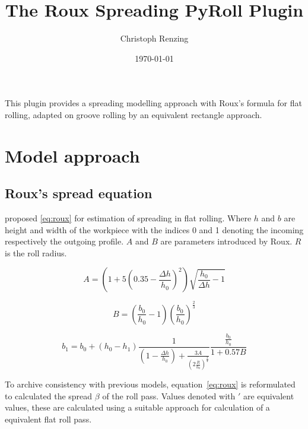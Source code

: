 \documentclass[11pt]{PyRollDocs}
\begin{document}
    \title{The Roux Spreading PyRoll Plugin}
    \author{Christoph Renzing}
    \date{\today}

    \maketitle

    This plugin provides a spreading modelling approach with Roux's formula for flat rolling, adapted on groove rolling by an equivalent rectangle approach.


    \section{Model approach}\label{sec:model-approach}

    \subsection{Roux's spread equation}\label{subsec:roux's-spread-equation}

    \textcite{Roux1939} proposed \autoref{eq:roux} for estimation of spreading in flat rolling.
    Where $h$ and $b$ are height and width of the workpiece with the indices 0 and 1 denoting the incoming respectively the outgoing profile.
    $A$ and $B$ are parameters introduced by Roux.
    $R$ is the roll radius.


    \begin{equation}
        A = \left( 1 + 5 \left( 0.35 - \frac{\Delta h}{h_0}\right)^2 \right) \sqrt{\frac{h_0}{\Delta h} - 1}
        \label{eq:roux-parameter-a}
    \end{equation}

    \begin{equation}
        B = \left( \frac{b_0}{h_0} - 1 \right) \left( \frac{b_0}{h_0} \right)^{\frac{2}{3}}
        \label{eq:roux-parameter-b}
    \end{equation}

    \begin{equation}
        b_1 = b_0 + \left( h_0 - h_1 \right) \frac{1}{\left( 1 - \frac{\Delta h}{h_0} \right) + \frac{3 A}{\left( 2 \frac{R}{h_0} \right)^{\frac{3}{4}}}} \frac{\frac{b_0}{h_0}}{1 + 0.57 B}
        \label{eq:roux}
    \end{equation}

    To archive consistency with previous models, equation~\ref{eq:roux} is reformulated to calculated the spread $\beta$ of the roll pass.
    Values denoted with $'$ are equivalent values, these are calculated using a suitable approach for calculation of a equivalent flat roll pass.
\end{document}
